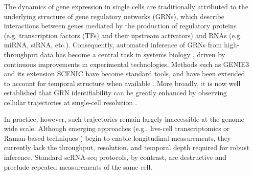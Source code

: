 \documentclass[a4paper, 11pt]{article}
\theoremstyle{plain}
\theoremstyle{remark}
\begin{document}
The dynamics of gene expression in single cells are traditionally attributed to the underlying structure of gene regulatory networks (GRNs), which describe interactions between genes mediated by the production of regulatory proteins (e.g. transcription factors (TFs) and their upstream activators) and RNAs (e.g. miRNA, siRNA, etc.). Consequently, automated inference of GRNs from high-throughput data has become a central task in systems biology \cite{sanguinetti2019gene}, driven by continuous improvements in experimental technologies. Methods such as GENIE3 \cite{huynh2010inferring} and its extension SCENIC \cite{aibar2017scenic} have become standard tools, and have been extended to account for temporal structure when available \cite{huynh2018dyngenie3}. More broadly, it is now well established that GRN identifiability can be greatly enhanced by observing cellular trajectories at single-cell resolution \cite{qiu2020inferring}.

In practice, however, such trajectories remain largely inaccessible at the genome-wide scale. Although emerging approaches (e.g., live-cell transcriptomics or Raman-based techniques \cite{chen2022live, kobayashi2024prediction}) begin to enable longitudinal measurements, they currently lack the throughput, resolution, and temporal depth required for robust inference. Standard scRNA-seq protocols, by contrast, are destructive and preclude repeated measurements of the same cell.
\end{document}
